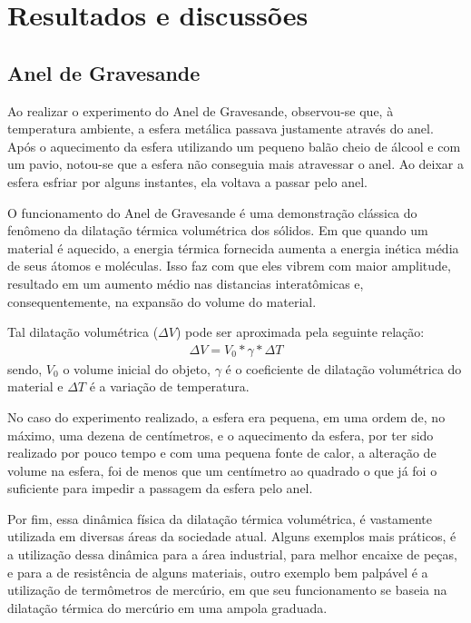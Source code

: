 \section{Resultados e discussões}

\subsection{Anel de Gravesande}
Ao realizar o experimento do Anel de Gravesande, observou-se que, à temperatura ambiente, a esfera metálica passava justamente através do anel. Após o aquecimento da esfera utilizando um pequeno balão cheio de álcool e com um pavio, notou-se que a esfera não conseguia mais atravessar o anel. Ao deixar a esfera esfriar por alguns instantes, ela voltava a passar pelo anel.

O funcionamento do Anel de Gravesande é uma demonstração clássica do fenômeno da dilatação térmica volumétrica dos sólidos. Em que quando um material é aquecido, a energia térmica fornecida aumenta a energia inética média de seus átomos e moléculas. Isso faz com que eles vibrem com maior amplitude, resultado em um aumento médio nas distancias interatômicas e, consequentemente, na expansão do volume do material.

Tal dilatação volumétrica (\(\Delta V\)) pode ser aproximada pela seguinte relação:
\begin{align*}
	\Delta V = V_0 * \gamma * \Delta T
\end{align*}
sendo, \(V_0\) o volume inicial do objeto, \(\gamma\) é o coeficiente de dilatação volumétrica do material e \(\Delta T\) é a variação de temperatura.

No caso do experimento realizado, a esfera era pequena, em uma ordem de, no máximo, uma dezena de centímetros, e o aquecimento da esfera, por ter sido realizado por pouco tempo e com uma pequena fonte de calor, a alteração de volume na esfera, foi de menos que um centímetro ao quadrado o que já foi o suficiente para impedir a passagem da esfera pelo anel.

Por fim, essa dinâmica física da dilatação térmica  volumétrica, é vastamente utilizada em diversas áreas da sociedade atual. Alguns exemplos mais práticos, é a utilização dessa dinâmica para a área industrial, para melhor encaixe de peças, e para a de resistência de alguns materiais, outro exemplo bem palpável é a utilização de termômetros de mercúrio, em que seu funcionamento se baseia na dilatação térmica do mercúrio em uma ampola graduada.  

